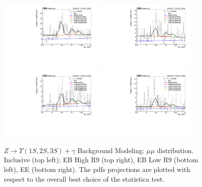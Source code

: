 \begin{figure}[!htbp]
\begin{center}
\includegraphics[width=0.45\textwidth]{figures_and_tables/fitPlotFiles2D/ftestOutput2D/outdir_ZToUpsilonPhoton_Cat0/bkgfTest-Data/mMuMU_multipdf_UntaggedTag_0}\hspace*{1.cm}
\includegraphics[width=0.45\textwidth]{figures_and_tables/fitPlotFiles2D/ftestOutput2D/outdir_ZToUpsilonPhoton_Cat1/bkgfTest-Data/mMuMU_multipdf_UntaggedTag_0}
\includegraphics[width=0.45\textwidth]{figures_and_tables/fitPlotFiles2D/ftestOutput2D/outdir_ZToUpsilonPhoton_Cat2/bkgfTest-Data/mMuMU_multipdf_UntaggedTag_0}\hspace*{1.cm}
\includegraphics[width=0.45\textwidth]{figures_and_tables/fitPlotFiles2D/ftestOutput2D/outdir_ZToUpsilonPhoton_Cat3/bkgfTest-Data/mMuMU_multipdf_UntaggedTag_0}
\end{center}\vspace*{-.5cm}
\caption{$Z \rightarrow \Upsilon(1S,2S,3S) +\gamma$ Background Modeling: $\mu\mu$ distribution. Inclusive (top left); EB High R9 (top right), EB Low R9 (bottom left), EE (bottom right). The pdfs projections are plotted with respect to the overall best choice of the statistica test.}
\label{fig:ZToUpsilon_mMuMU_Projection}
\end{figure}

